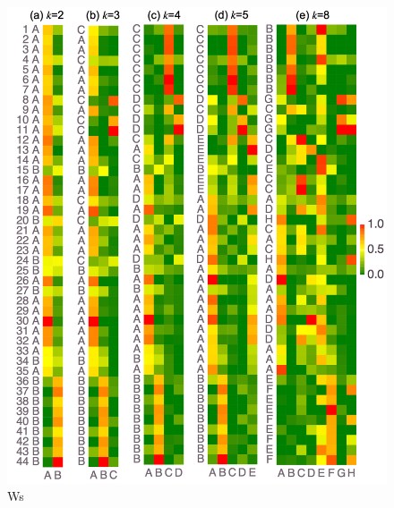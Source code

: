 \documentclass[11pt]{article}
\begin{document}
\begin{figure}
\centering
\includegraphics{../figures-case01/locations.png}
\caption{Ws}
\end{figure}
\end{document}
